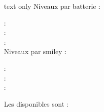 \documentclass[french,11pt,a4paper]{article}
\begin{document}
\begin{DemoCode}{text only}
Niveaux par \og batterie \fg :

   : \DeuxNivBatterie\\
  : \TroisNivBatterie \\
 : \QuatreNivBatterie\\

Niveaux par \og smiley \fg :

     : \DeuxNivSmiley\\
    : \TroisNivSmiley\\
   : \QuatreNivSmiley
\end{DemoCode}

\pagebreak

Les  disponibles sont :
\end{document}
